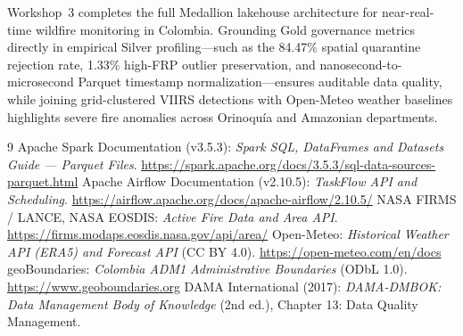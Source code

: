 \documentclass[11pt,letterpaper]{article}
\begin{document}
Workshop~3 completes the full Medallion lakehouse architecture for near-real-time wildfire monitoring in Colombia. Grounding Gold governance metrics directly in empirical Silver profiling—such as the 84.47\% spatial quarantine rejection rate, 1.33\% high-FRP outlier preservation, and nanosecond-to-microsecond Parquet timestamp normalization—ensures auditable data quality, while joining grid-clustered VIIRS detections with Open-Meteo weather baselines highlights severe fire anomalies across Orinoquía and Amazonian departments.
\begin{thebibliography}{9}
   Apache Spark Documentation (v3.5.3): \emph{Spark SQL, DataFrames and Datasets Guide — Parquet Files}. \url{https://spark.apache.org/docs/3.5.3/sql-data-sources-parquet.html}
   Apache Airflow Documentation (v2.10.5): \emph{TaskFlow API and Scheduling}. \url{https://airflow.apache.org/docs/apache-airflow/2.10.5/}
   NASA FIRMS / LANCE, NASA EOSDIS: \emph{Active Fire Data and Area API}. \url{https://firms.modaps.eosdis.nasa.gov/api/area/}
   Open-Meteo: \emph{Historical Weather API (ERA5) and Forecast API} (CC BY 4.0). \url{https://open-meteo.com/en/docs}
   geoBoundaries: \emph{Colombia ADM1 Administrative Boundaries} (ODbL 1.0). \url{https://www.geoboundaries.org}
   DAMA International (2017): \emph{DAMA-DMBOK: Data Management Body of Knowledge} (2nd ed.), Chapter 13: Data Quality Management.
\end{thebibliography}
\end{document}
